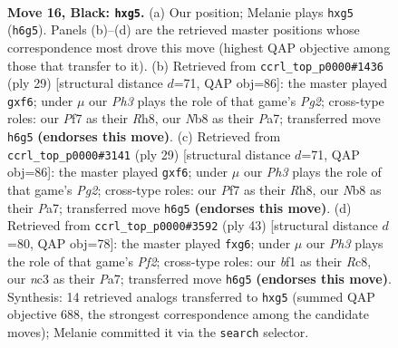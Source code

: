 \documentclass[11pt]{article}
\begin{document}
\clearpage

\begin{figure}[p]\centering
\begin{subfigure}{0.46\textwidth}\centering
\resizebox{\linewidth}{!}{%
\newchessgame
\chessboard[
  setfen={rn3r2/1pp1bp1k/p6p/4P1PP/P1p3b1/2N1P3/1P1N4/R3KB1R b KQ - 0 16},
  showmover=false,
  pgfstyle=straightmove, color=movearrow, markmove={h6-g5}
]}
\caption{}
\end{subfigure}\hfill
\begin{subfigure}{0.46\textwidth}\centering
\resizebox{\linewidth}{!}{%
\newchessgame
\chessboard[
  setfen={r1b1k2r/ppp3p1/2p2P2/7p/6Pb/2N2P1P/PPP5/R1BR2K1 b - - 0 15},
  showmover=false,
  pgfstyle=straightmove, color=movearrow, markmove={g7-f6}
]}
\caption{}
\end{subfigure}
\\[4pt]
\begin{subfigure}{0.46\textwidth}\centering
\resizebox{\linewidth}{!}{%
\newchessgame
\chessboard[
  setfen={r1b1k2r/ppp3p1/2p2P2/7p/6Pb/2N2P1P/PPP5/R1BR2K1 b - - 0 15},
  showmover=false,
  pgfstyle=straightmove, color=movearrow, markmove={g7-f6}
]}
\caption{}
\end{subfigure}\hfill
\begin{subfigure}{0.46\textwidth}\centering
\resizebox{\linewidth}{!}{%
\newchessgame
\chessboard[
  setfen={r1r3k1/pp1n1p2/4p1PB/2PbP3/3Np3/8/P1P2PP1/1R2K2R b K - 0 22},
  showmover=false,
  pgfstyle=straightmove, color=movearrow, markmove={f7-g6}
]}
\caption{}
\end{subfigure}
\caption{\textbf{Move 16, Black: \texttt{hxg5}.} (a) Our position; Melanie plays \texttt{hxg5} (\texttt{h6g5}). Panels (b)--(d) are the retrieved master positions whose correspondence most drove this move (highest QAP objective among those that transfer to it). (b) Retrieved from \texttt{ccrl\_top\_p0000\#1436} (ply 29) [structural distance $d$=71, QAP obj=86]: the master played \texttt{gxf6}; under $\mu$ our \emph{Ph3} plays the role of that game's \emph{Pg2}; cross-type roles: our \emph{P}f7 as their \emph{R}h8, our \emph{N}b8 as their \emph{P}a7; transferred move \texttt{h6g5} \textbf{(endorses this move)}. (c) Retrieved from \texttt{ccrl\_top\_p0000\#3141} (ply 29) [structural distance $d$=71, QAP obj=86]: the master played \texttt{gxf6}; under $\mu$ our \emph{Ph3} plays the role of that game's \emph{Pg2}; cross-type roles: our \emph{P}f7 as their \emph{R}h8, our \emph{N}b8 as their \emph{P}a7; transferred move \texttt{h6g5} \textbf{(endorses this move)}. (d) Retrieved from \texttt{ccrl\_top\_p0000\#3592} (ply 43) [structural distance $d$=80, QAP obj=78]: the master played \texttt{fxg6}; under $\mu$ our \emph{Ph3} plays the role of that game's \emph{Pf2}; cross-type roles: our \emph{b}f1 as their \emph{R}c8, our \emph{n}c3 as their \emph{P}a7; transferred move \texttt{h6g5} \textbf{(endorses this move)}. Synthesis: 14 retrieved analogs transferred to \texttt{hxg5} (summed QAP objective 688, the strongest correspondence among the candidate moves); Melanie committed it via the \texttt{search} selector.}
\label{fig:thought-m31}
\end{figure}
\end{document}
